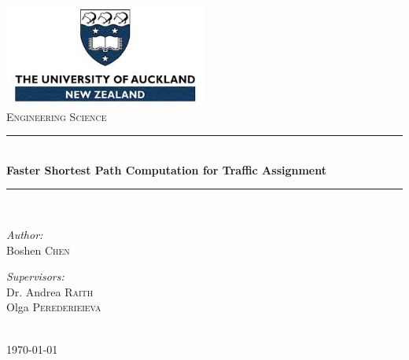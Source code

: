 \begin{titlepage}
    \newcommand{\HRule}{\rule{\linewidth}{0.5mm}}
    \centering
    \includegraphics[width=0.5\textwidth]{img/logo.jpg}\\[2cm]    
    \textsc{\Large Engineering Science}\\[2cm]
    \HRule \\[0.4cm]
    { \huge \bfseries Faster Shortest Path Computation for Traffic Assignment
    }\\[0.4cm]
    \HRule \\[2cm]

    \begin{minipage}{0.4\textwidth}
        \begin{flushleft} \large
            \emph{Author:}\\
            Boshen \textsc{Chen}
        \end{flushleft}
    \end{minipage}
    \begin{minipage}{0.4\textwidth}
        \begin{flushright} \large
            \emph{Supervisors:} \\
            Dr. Andrea \textsc{Raith} \\
            Olga \textsc{Perederieieva}
        \end{flushright}
    \end{minipage}\\[4cm]

    \vfill
    {\large \mydate \today}
    \thispagestyle{empty}
\end{titlepage} 
